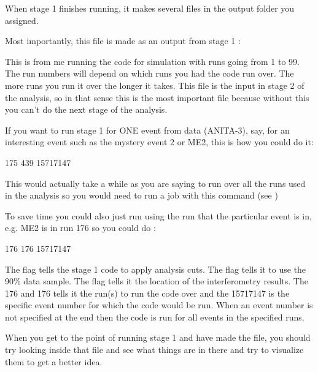 When stage 1 finishes running, it makes several files in the output folder you assigned.

Most importantly, this file is made as an output from stage 1 : 

\begin{center}
\end{center}

This is from me running the code for simulation with runs going from 1 to 99. 
The run numbers will depend on which runs you had the code run over.
The more runs you run it over the longer it takes.
This file is the input in stage 2 of the analysis, so in that sense this is the most important file because without this you can’t do the next stage of the analysis.

If you want to 
run stage 1 for ONE event from data (ANITA-3), say, for an interesting event such as the mystery event 2 or ME2, this is how you could do it: 

\begin{center}
    175 439 15717147
\end{center}

This would actually take a while as you are saying to run over all the runs used in the analysis so you would need to run a job with this command (see ) 

To save time you could also just run using the run that the particular event is in, e.g. ME2 is in run 176 so you could do : 

\begin{center}
    176 176 15717147
\end{center}

The  flag tells the stage 1 code to apply analysis cuts. The  flag tells it to use the 90\% data sample. The  flag tells it the location of the interferometry results. The 176 and 176 tells it the run(s) to run the code over and the 15717147 is the specific event number for which the code would be run. When an event number is not specified at the end then the code is run for all events in the specified runs. 

When you get to the point of running stage 1 and have made the  file, you should try looking inside that file and see what things are in there and try to visualize them to get a better idea. 


